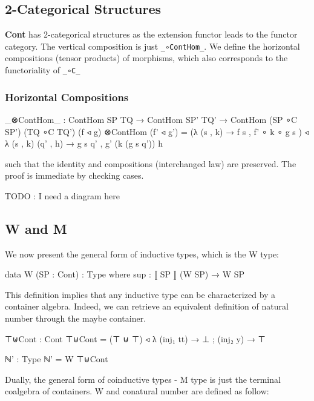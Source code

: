 \subsection{2-Categorical Structures}

\textbf{Cont} has 2-categorical structures as the extension functor leads to the functor category. The vertical composition is just \texttt{\_∘ContHom\_}. We define the horizontal compositions (tensor products) of morphisms, which also corresponds to the functoriality of \texttt{\_∘C\_}

\subsubsection*{Horizontal Compositions}

\begin{code}
_⊗ContHom_ : ContHom SP TQ → ContHom SP' TQ' → ContHom (SP ∘C SP') (TQ ∘C TQ')
(f ◃ g) ⊗ContHom (f' ◃ g') 
  = (λ{ (s , k) → f s , f' ∘ k ∘ g s }) 
  ◃ λ{ (s , k) (q' , h) → g s q' , g' (k (g s q')) h }
\end{code}

such that the identity and compositions (interchanged law) are preserved. The proof is immediate by checking cases.

TODO : I need a diagram here

\subsection{W and M}

We now present the general form of inductive types, which is the W type:

\begin{code}
data W (SP : Cont) : Type where
  sup : ⟦ SP ⟧ (W SP) → W SP
\end{code}

This definition implies that any inductive type can be characterized by a container algebra. Indeed, we can retrieve an equivalent definition of natural number through the maybe container.

\begin{code}
⊤⊎Cont : Cont
⊤⊎Cont = (⊤ ⊎ ⊤) ◃ λ{ (inj₁ tt) → ⊥ ; (inj₂ y) → ⊤ }

ℕ' : Type
ℕ' = W ⊤⊎Cont
\end{code}

Dually, the general form of coinductive types - M type is just the terminal coalgebra of containers. W and conatural number are defined as follow:

